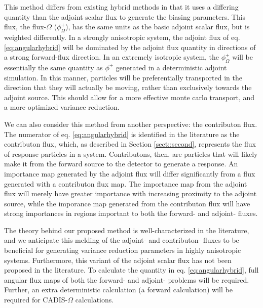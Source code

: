 \documentclass[12pt]{article}
\begin{document}
This method differs from existing hybrid methods in that it uses a differing quantity than the adjoint scalar flux to generate the biasing parameters. This flux, the flux-$\Omega$ ($\phi^{+}_{\Omega}$), has the same units as the basic adjoint scalar flux, but is weighted differently. In a strongly anisotropic system, the adjoint flux of eq. \eqref{eq:angularhybrid} will be dominated by the adjoint flux quantity in directions of a strong forward-flux direction. In an extremely isotropic system, the $\phi^{+}_{\Omega}$ will be essentially the same quantity as $\phi^{+}$ generated in a deterministic adjoint simulation. In this manner, particles will be preferentially transported in the direction that they will actually be moving, rather than exclusively towards the adjoint source. This should allow for a more effective monte carlo transport, and a more optimized variance reduction. 

We can also consider this method from another perspective: the contributon flux. The numerator of eq. \eqref{eq:angularhybrid} is identified in the literature as the contributon flux, which, as described in Section \ref{sect::second}, represents the flux of response particles in a system. Contributons, then, are particles that will likely make it from the forward source to the detector to generate a response. An importance map generated by the adjoint flux will differ significantly from a flux generated with a contributon flux map. The importance map from the adjoint flux will merely have greater importance with increasing proximity to the adjoint source, while the imporance map generated from the contributon flux will have strong importances in regions important to both the forward- and adjoint- fluxes. 

The theory behind our proposed method is well-characterized in the literature, and we anticipate this melding of the adjoint- and contributon- fluxes to be beneficial for generating variance reduction parameters in highly anisotropic systems. Furthermore, this variant of the adjoint scalar flux has not been proposed in the literature. To calculate the quantity in eq. \eqref{eq:angularhybrid}, full angular flux maps of both the forward- and adjoint- problems will be required. Further, an extra deterministic calculation (a forward calculation) will be required for CADIS-$\Omega$ calculations.


\end{document}
